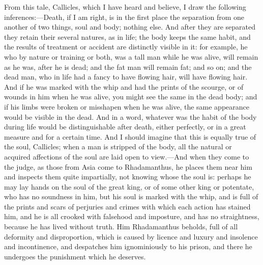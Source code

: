 \documentclass[11pt,letter]{article}
\begin{document}
\par  From this tale, Callicles, which I have heard and believe, I draw the following inferences:—Death, if I am right, is in the first place the separation from one another of two things, soul and body; nothing else. And after they are separated they retain their several natures, as in life; the body keeps the same habit, and the results of treatment or accident are distinctly visible in it: for example, he who by nature or training or both, was a tall man while he was alive, will remain as he was, after he is dead; and the fat man will remain fat; and so on; and the dead man, who in life had a fancy to have flowing hair, will have flowing hair. And if he was marked with the whip and had the prints of the scourge, or of wounds in him when he was alive, you might see the same in the dead body; and if his limbs were broken or misshapen when he was alive, the same appearance would be visible in the dead. And in a word, whatever was the habit of the body during life would be distinguishable after death, either perfectly, or in a great measure and for a certain time. And I should imagine that this is equally true of the soul, Callicles; when a man is stripped of the body, all the natural or acquired affections of the soul are laid open to view.—And when they come to the judge, as those from Asia come to Rhadamanthus, he places them near him and inspects them quite impartially, not knowing whose the soul is: perhaps he may lay hands on the soul of the great king, or of some other king or potentate, who has no soundness in him, but his soul is marked with the whip, and is full of the prints and scars of perjuries and crimes with which each action has stained him, and he is all crooked with falsehood and imposture, and has no straightness, because he has lived without truth. Him Rhadamanthus beholds, full of all deformity and disproportion, which is caused by licence and luxury and insolence and incontinence, and despatches him ignominiously to his prison, and there he undergoes the punishment which he deserves.
\end{document}
